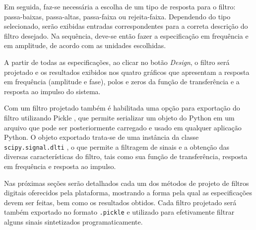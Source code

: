 \documentclass[12pt,a4paper]{report}
\begin{document}
  Em seguida, faz-se necessária a escolha de um tipo de resposta para o filtro: passa-baixas, passa-altas,
  passa-faixa ou rejeita-faixa. Dependendo do tipo selecionado, serão exibidas entradas correspondentes para a
  correta descrição do filtro desejado. Na sequência, deve-se então fazer a especificação em frequência e em
  amplitude, de acordo com as unidades escolhidas.

  A partir de todas as especificações, ao clicar no botão \textit{Design}, o filtro será projetado e os
  resultados exibidos nos quatro gráficos que apresentam a resposta em frequência (amplitude e fase), polos e
  zeros da função de transferência e a resposta ao impulso do sistema.

  Com um filtro projetado também é habilitada uma opção para exportação do filtro utilizando Pickle
  \cite{pickle}, que permite serializar um objeto do Python em um arquivo que pode ser posteriormente carregado
  e usado em qualquer aplicação Python. O objeto exportado trata-se de uma instância da classe
  \texttt{scipy.signal.dlti} \cite{scipy}, o que permite a filtragem de sinais e a obtenção das diversas
  características do filtro, tais como sua função de transferência, resposta em frequência e resposta ao impulso.

  Nas próximas seções serão detalhados cada um dos métodos de projeto de filtros digitais oferecidos pela
  plataforma, mostrando a forma pela qual as especificações devem ser feitas, bem como os resultados obtidos.
  Cada filtro projetado será também exportado no formato \texttt{.pickle} e utilizado para efetivamente filtrar
  alguns sinais sintetizados programaticamente.
\end{document}
